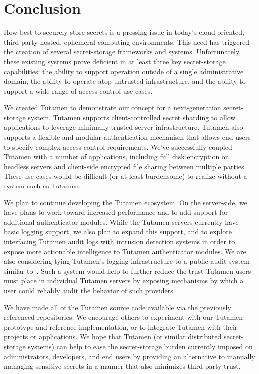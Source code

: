 \section{Conclusion}
\label{sec:conclusion}

How best to securely store secrets is a pressing issue in today's
cloud-oriented, third-party-hosted, ephemeral computing
environments. This need has triggered the creation of several
secret-storage frameworks and systems. Unfortunately, these existing
systems prove deficient in at least three key secret-storage
capabilities: the ability to support operation outside of a single
administrative domain, the ability to operate atop untrusted
infrastructure, and the ability to support a wide range of access
control use cases.

We created Tutamen to demonstrate our concept for a next-generation
secret-storage system. Tutamen supports client-controlled secret
sharding to allow applications to leverage minimally-trusted server
infrastructure. Tutamen also supports a flexible and modular
authentication mechanism that allows end users to specify complex
access control requirements. We've successfully coupled Tutamen with a
number of applications, including full disk encryption on headless
servers and client-side encrypted file sharing between multiple
parties. These use cases would be difficult (or at least burdensome)
to realize without a system such as Tutamen.

We plan to continue developing the Tutamen ecosystem. On the
server-side, we have plans to work toward increased performance and to
add support for additional authenticator modules. While the Tutamen
servers currently have basic logging support, we also plan to expand
this support, and to explore interfacing Tutamen audit logs with
intrusion detection systems in order to expose more actionable
intelligence to Tutamen authenticator modules. We are also considering
tying Tutamen's logging infrastructure to a public audit system
similar to~\cite{laurie2013}. Such a system would help to further
reduce the trust Tutamen users must place in individual Tutamen
servers by exposing mechanisms by which a user could reliably audit
the behavior of such providers.

We have made all of the Tutamen source code available via the
previously referenced repositories. We encourage others to experiment
with our Tutamen prototype and reference implementation, or to
integrate Tutamen with their projects or applications. We hope that
Tutamen (or similar distributed secret-storage systems) can help to
ease the secret-storage burden currently imposed on administrators,
developers, and end users by providing an alternative to manually
managing sensitive secrets in a manner that also minimizes third party
trust.

